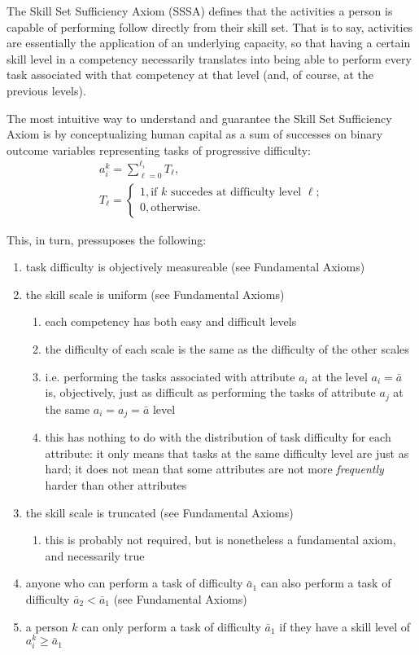 \documentclass{elsarticle} %
\begin{document}
The Skill Set Sufficiency Axiom (SSSA) defines that the activities a person is capable of performing follow directly from their skill set. That is to say, activities are essentially the application of an underlying capacity, so that having a certain skill level in a competency necessarily translates into being able to perform every task associated with that competency at that level (and, of course, at the previous levels).

The most intuitive way to understand and guarantee the Skill Set Sufficiency Axiom is by conceptualizing human capital as a sum of successes on binary outcome variables representing tasks of progressive difficulty:
\begin{gather}
    a_{i}^{k} = \sum_{\ell=0}^{\ell_i}T_{\ell}
    ,\\
    T_{\ell} = \begin{cases}
        1, \text{if $k$ succedes at difficulty level $\ell$;}\\
        0, \text{otherwise.}
    \end{cases}
\end{gather}

This, in turn, pressuposes the following:
\begin{enumerate}
    \item task difficulty is objectively measureable (see Fundamental Axioms)
    \item the skill scale is uniform (see Fundamental Axioms)
    \begin{enumerate}
        \item each competency has both easy and difficult levels
        \item the difficulty of each scale is the same as the difficulty of the other scales
        \item i.e. performing the tasks associated with attribute $a_i$ at the level $a_i = \bar{a}$ is, objectively, just as difficult as performing the tasks of attribute $a_j$ at the same $a_i = a_j = \bar{a}$ level
        \item this has nothing to do with the distribution of task difficulty for each attribute: it only means that tasks at the same difficulty level are just as hard; it does not mean that some attributes are not more \textit{frequently} harder than other attributes
    \end{enumerate}
    \item the skill scale is truncated (see Fundamental Axioms)
    \begin{enumerate}
        \item this is probably not required, but is nonetheless a fundamental axiom, and necessarily true
    \end{enumerate}
    \item anyone who can perform a task of difficulty $\bar{a}_1$ can also perform a task of difficulty $\bar{a}_2 < \bar{a}_1$ (see Fundamental Axioms)
    \item a person $k$ can only perform a task of difficulty $\bar{a}_1$ if they have a skill level of $a_{i}^{k} \geq \bar{a}_1$
\end{enumerate}
\end{document}

